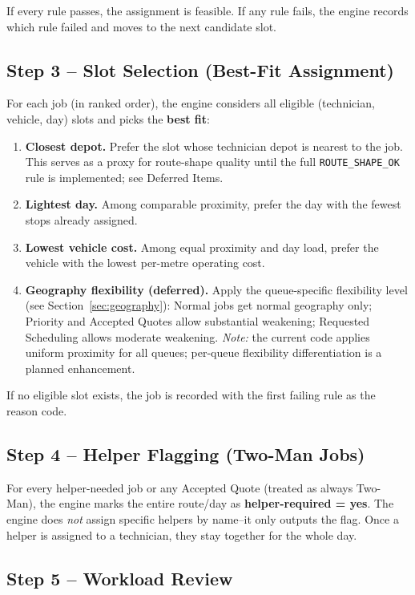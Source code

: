 \documentclass[12pt]{article}
\begin{document}
If every rule passes, the assignment is feasible.  If any rule fails, the engine records which rule failed and moves to the next candidate slot.

\subsection*{Step 3 -- Slot Selection (Best-Fit Assignment)}

For each job (in ranked order), the engine considers all eligible (technician, vehicle, day) slots and picks the \textbf{best fit}:

\begin{enumerate}
    \item \textbf{Closest depot.} Prefer the slot whose technician depot is nearest to the job.  This serves as a proxy for route-shape quality until the full \texttt{ROUTE\_SHAPE\_OK} rule is implemented; see Deferred Items.
    \item \textbf{Lightest day.} Among comparable proximity, prefer the day with the fewest stops already assigned.
    \item \textbf{Lowest vehicle cost.}  Among equal proximity and day load, prefer the vehicle with the lowest per-metre operating cost.
    \item \textbf{Geography flexibility (deferred).} Apply the queue-specific flexibility level (see Section~\ref{sec:geography}): Normal jobs get normal geography only; Priority and Accepted Quotes allow substantial weakening; Requested Scheduling allows moderate weakening.  \emph{Note:} the current code applies uniform proximity for all queues; per-queue flexibility differentiation is a planned enhancement.
\end{enumerate}

If no eligible slot exists, the job is recorded with the first failing rule as the reason code.

\subsection*{Step 4 -- Helper Flagging (Two-Man Jobs)}

For every helper-needed job or any Accepted Quote (treated as always Two-Man), the engine marks the entire route/day as \textbf{helper-required = yes}.
The engine does \emph{not} assign specific helpers by name--it only outputs the flag.
Once a helper is assigned to a technician, they stay together for the whole day.

\subsection*{Step 5 -- Workload Review}
\end{document}
